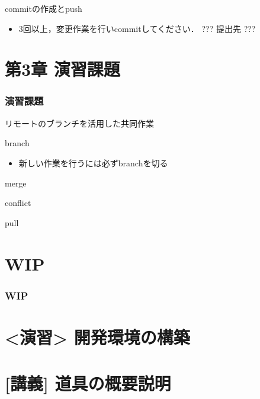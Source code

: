 \documentclass[12pt, t, aspectratio=169]{beamer}
\begin{document}
\begin{frame}[label=sec-2-5-2]{commitの作成とpush}
\begin{itemize}
\item 3回以上，変更作業を行いcommitしてください．
??? 提出先 ???
\end{itemize}
\end{frame}

\part{第3章 演習課題}
\label{sec-3}
\section{演習課題}
\label{sec-3-1}
\begin{frame}[label=sec-3-1-1]{リモートのブランチを活用した共同作業}
\end{frame}
\begin{frame}[label=sec-3-1-2]{branch}
\begin{itemize}
\item 新しい作業を行うには必ずbranchを切る
\end{itemize}
\end{frame}
\begin{frame}[label=sec-3-1-3]{merge}
\end{frame}
\begin{frame}[label=sec-3-1-4]{conflict}
\end{frame}
\begin{frame}[label=sec-3-1-5]{pull}
\end{frame}


\part{{\bfseries\sffamily WIP} }
\label{sec-4}
\section{{\bfseries\sffamily WIP} }
\label{sec-4-1}
\part{<演習> 開発環境の構築}
\label{sec-5}
\part{[講義] 道具の概要説明}
\label{sec-6}
\end{document}
